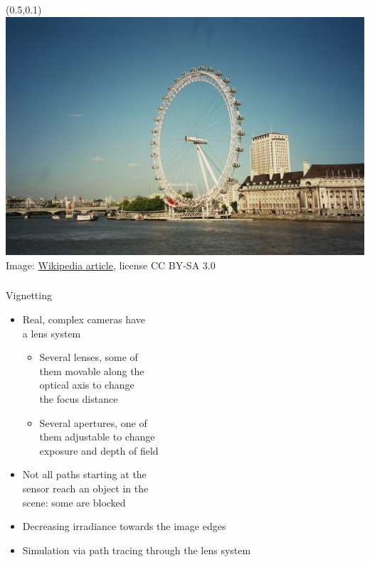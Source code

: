 \documentclass[utf8,stillsansserifmath,fleqn,t]{beamer}
\begin{document}
\begin{frame}
\begin{textblock}{0.5}(0.5,0.1)\includegraphics[width=\textwidth]{./fig/vignetting-example.jpg}\\
{\tiny Image: \href{https://de.wikipedia.org/wiki/Vignettierung}{Wikipedia article}, license CC BY-SA 3.0}
\end{textblock}
\frametitle{\insertsection}
Vignetting
\begin{itemize}
\item Real, complex cameras have\\ a lens system
\begin{itemize}
\item Several lenses, some of\\ them movable along the\\ optical axis to
change\\ the focus distance
\item Several apertures, one of\\ them adjustable to change\\ exposure and depth of
field
\end{itemize}
\item Not all paths starting at the\\ sensor 
reach an object in the\\ scene: some are blocked
\item Decreasing irradiance towards the image edges
\item Simulation via path tracing through the lens system
\end{itemize}
\end{frame}
\end{document}
